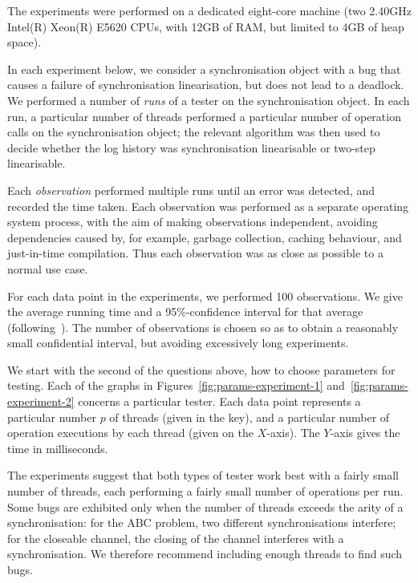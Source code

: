 The experiments were performed on a dedicated eight-core machine (two 2.40GHz
Intel(R) Xeon(R) E5620 CPUs, with 12GB of RAM, but limited to 4GB of heap
space).

In each experiment below, we consider a synchronisation object with a bug that
causes a failure of synchronisation linearisation, but does not lead to a
deadlock.  We performed a number of \emph{runs} of a tester on the
synchronisation object.  In each run, a particular number of threads performed
a particular number of operation calls on the synchronisation object; the
relevant algorithm was then used to decide whether the log history was
synchronisation linearisable or two-step linearisable.

Each \emph{observation} performed multiple runs until an error was detected,
and recorded the time taken.  Each observation was performed as a separate
operating system process, with the aim of making observations independent,
avoiding dependencies caused by, for example, garbage collection, caching
behaviour, and just-in-time compilation.  Thus each observation was as close
as possible to a normal use case.

For each data point in the experiments, we performed 100 observations.  We
give the average running time and a 95\%-confidence interval for that average
(following~\cite{GBE2007}).  The number of observations is chosen so as to
obtain a reasonably small confidential interval, but avoiding excessively long
experiments.


We start with the second of the questions above, how to choose parameters for
testing.  Each of the graphs in Figures~\ref{fig:params-experiment-1}
and~\ref{fig:params-experiment-2} concerns a particular
tester.  Each data point represents a particular number $p$ of threads (given in
the key), and a particular number of operation executions by each thread
(given on the $X$-axis).
The $Y$-axis gives the time in milliseconds.



The experiments suggest that both types of tester work best with a fairly
small number of threads, each performing a fairly small number of operations
per run.  Some bugs are exhibited only when the number of threads exceeds the
arity of a synchronisation: for the ABC problem, two different
synchronisations interfere; for the closeable channel, the closing of the
channel interferes with a synchronisation.  We therefore recommend including
enough threads to find such bugs. 

